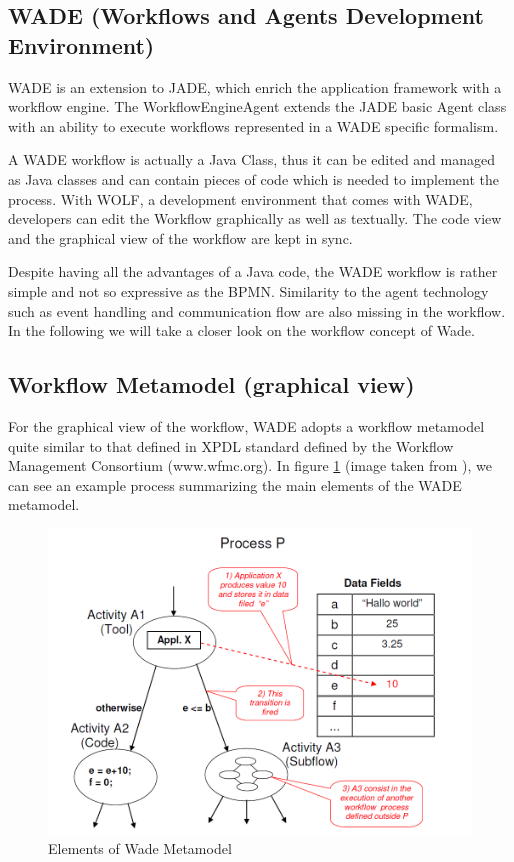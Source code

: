 \subsection{WADE (Workflows and Agents Development Environment)}
WADE is an extension to JADE, which enrich the application framework with a workflow engine. The WorkflowEngineAgent extends the JADE basic Agent class with an ability to execute workflows represented in a WADE specific formalism.

A WADE workflow is actually a Java Class, thus it can be edited and managed as Java classes and can contain pieces of code which is needed to implement the process. With WOLF, a development environment that comes with WADE, developers can edit the Workflow graphically as well as textually. The code view and the graphical view of the workflow are kept in sync.

Despite having all the advantages of a Java code, the WADE workflow is rather simple and not so expressive as the BPMN. Similarity to the agent technology such as event handling and communication flow are also missing in the workflow. In the following we will take a closer look on the workflow concept of Wade. 


\subsection{Workflow Metamodel (graphical view)}
For the graphical view of the workflow, WADE adopts a workflow metamodel quite similar to that defined in XPDL standard defined by the Workflow Management Consortium (www.wfmc.org). In figure \ref{fig:wade_elements} (image taken from \cite{GCDGMB08}), we can see an example process summarizing the main elements of the WADE metamodel.
\begin{figure}[h]
	\centering
		\includegraphics[width=1.00\textwidth]{images/wade_elements.png}
	\caption{Elements of Wade Metamodel \cite{GCDGMB08}}
	\label{fig:wade_elements}
\end{figure}

